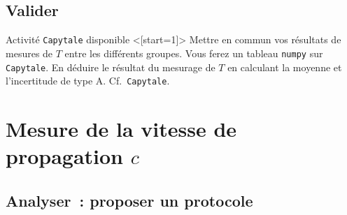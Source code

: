 \documentclass[../main/main.tex]{subfiles}
\begin{document}
\setcounter{subsection}{1}
\subsection{Valider}
Activité \texttt{Capytale} disponible
\QR<[start=1]>{%
	Mettre en commun vos résultats de mesures de $T$ entre les différents
	groupes. Vous ferez un tableau \texttt{numpy} sur \texttt{Capytale}.
	\smallbreak
	En déduire le résultat du mesurage de $T$ en calculant la moyenne et
	l'incertitude de type A.
}{%
Cf.\ \texttt{Capytale}.
%
%
%
}


\section{Mesure de la vitesse de propagation $c$}

\subsection{Analyser~: proposer un protocole}
\end{document}
